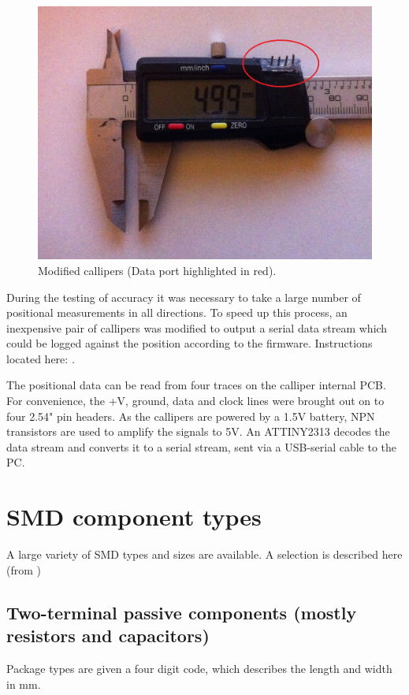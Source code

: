 \begin{figure}[ht!]
\centering
\includegraphics[width=150mm]{resources/callipermod.jpg}
\caption{Modified callipers (Data port highlighted in red).}
\label{overflow}
\end{figure}

During the testing of accuracy it was necessary to take a large number of positional measurements in all directions. 
To speed up this process, an inexpensive pair of callipers was modified to output a serial data stream which could be logged
against the position according to the firmware. Instructions located here: \cite{caliperdata}.

The positional data can be read from four traces on the calliper internal PCB. For convenience, the +V, ground, data and clock lines
were brought out on to four 2.54" pin headers. As the callipers are powered by a 1.5V battery, NPN transistors are used to amplify the signals to 5V. An ATTINY2313
decodes the data stream and converts it to a serial stream, sent via a USB-serial cable to the PC.

\newpage
\section{SMD component types}

A large variety of SMD types and sizes are available. A selection is described here (from \cite{smdwiki})

\subsection{Two-terminal passive components (mostly resistors and capacitors)}
Package types are given a four digit code, which describes the length and width in mm.

